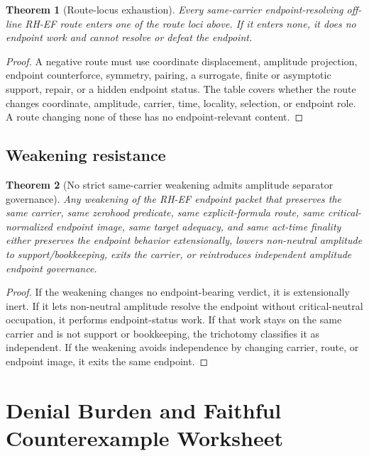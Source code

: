 \documentclass[11pt]{article}
\newtheorem{theorem}{Theorem}[section]
\begin{document}
\begin{theorem}[Route-locus exhaustion]
Every same-carrier endpoint-resolving off-line RH-EF route enters one of the route loci above.  If it enters none, it does no endpoint work and cannot resolve or defeat the endpoint.
\end{theorem}

\begin{proof}
A negative route must use coordinate displacement, amplitude projection, endpoint counterforce, symmetry, pairing, a surrogate, finite or asymptotic support, repair, or a hidden endpoint status.  The table covers whether the route changes coordinate, amplitude, carrier, time, locality, selection, or endpoint role.  A route changing none of these has no endpoint-relevant content.
\end{proof}

\subsection{Weakening resistance}

\begin{theorem}[No strict same-carrier weakening admits amplitude separator governance]
Any weakening of the RH-EF endpoint packet that preserves the same carrier, same zerohood predicate, same explicit-formula route, same critical-normalized endpoint image, same target adequacy, and same act-time finality either preserves the endpoint behavior extensionally, lowers non-neutral amplitude to support/bookkeeping, exits the carrier, or reintroduces independent amplitude endpoint governance.
\end{theorem}

\begin{proof}
If the weakening changes no endpoint-bearing verdict, it is extensionally inert.  If it lets non-neutral amplitude resolve the endpoint without critical-neutral occupation, it performs endpoint-status work.  If that work stays on the same carrier and is not support or bookkeeping, the trichotomy classifies it as independent.  If the weakening avoids independence by changing carrier, route, or endpoint image, it exits the same endpoint.
\end{proof}

\section{Denial Burden and Faithful Counterexample Worksheet}
\end{document}
